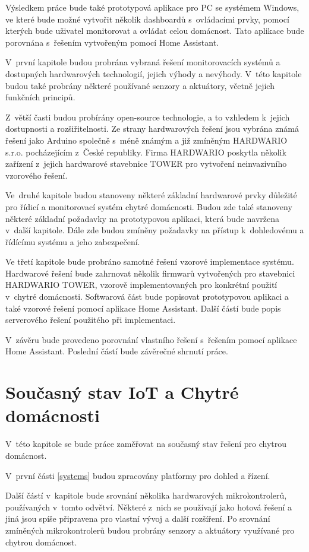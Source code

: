 Výsledkem práce bude také prototypová aplikace pro PC se systémem Windows, ve které bude možné vytvořit několik dashboardů s~ovládacími prvky, pomocí kterých bude uživatel monitorovat a ovládat celou domácnost. Tato aplikace bude porovnána s~řešením vytvořeným pomocí Home Assistant.

V~první kapitole budou probrána vybraná řešení monitorovacích systémů a dostupných hardwarových technologií, jejich výhody a nevýhody. V~této kapitole budou také probrány některé používané senzory a aktuátory, včetně jejich funkčních principů.

Z~větší časti budou probírány open-source technologie, a to vzhledem k~jejich dostupnosti a rozšiřitelnosti. Ze strany hardwarových řešení jsou vybrána známá řešení jako Arduino společně s~méně známým a již zmíněným HARDWARIO s.r.o. pocházejícím z~České republiky. Firma HARDWARIO poskytla několik zařízení z~jejich hardwarové stavebnice TOWER pro vytvoření neinvazivního vzorového řešení.

Ve~druhé kapitole budou stanoveny některé základní hardwarové prvky důležité pro řídicí a monitorovací systém chytré domácnosti. Budou zde také stanoveny některé základní požadavky na prototypovou aplikaci, která bude navržena v~další kapitole. Dále zde budou zmíněny požadavky na přístup k~dohledovému a řídícímu systému a jeho zabezpečení.

Ve třetí kapitole bude probráno samotné řešení vzorové implementace systému. Hardwarové řešení bude zahrnovat několik firmwarů vytvořených pro stavebnici HARDWARIO TOWER, vzorově implementovaných pro konkrétní použití v~chytré domácnosti. Softwarová část bude popisovat prototypovou aplikaci a také vzorové řešení pomocí aplikace Home Assistant. Další částí bude popis serverového řešení použitého při implementaci.

V~závěru bude provedeno porovnání vlastního řešení s~řešením pomocí aplikace Home Assistant. Poslední částí bude závěrečné shrnutí práce.

\chapter{Současný stav IoT a Chytré domácnosti}
\label{currentState}
V~této kapitole se bude práce zaměřovat na současný stav řešení pro chytrou domácnost. 

V~první části \ref{systems} budou zpracovány platformy pro dohled a řízení. 

Další částí v~kapitole bude srovnání několika hardwarových mikrokontrolerů, používaných v~tomto odvětví. Některé z~nich se používají jako hotová řešení a jiná jsou spíše připravena pro vlastní vývoj a další rozšíření. Po srovnání zmíněných mikrokontrolerů budou probrány senzory a aktuátory využívané pro chytrou domácnost.

